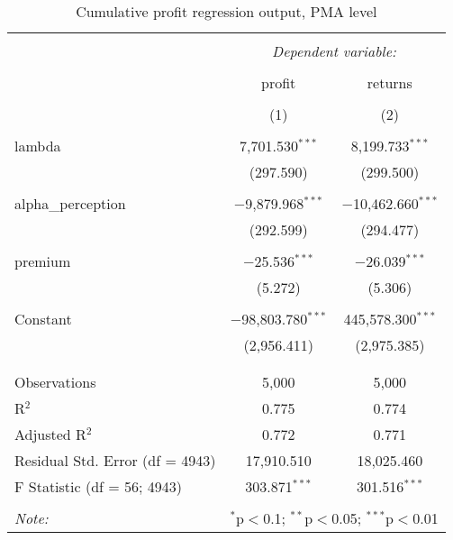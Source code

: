 
\begin{table}[!htbp] \centering 
  \caption{Cumulative profit regression output, PMA level} 
  \label{Tab:InformationConfidence-CumulativeProfit-regtable-pma} 
\begin{tabular}{@{\extracolsep{5pt}}lcc} 
\\[-1.8ex]\hline 
\hline \\[-1.8ex] 
 & \multicolumn{2}{c}{\textit{Dependent variable:}} \\ 
\cline{2-3} 
\\[-1.8ex] & profit & returns \\ 
\\[-1.8ex] & (1) & (2)\\ 
\hline \\[-1.8ex] 
 lambda & 7,701.530$^{***}$ & 8,199.733$^{***}$ \\ 
  & (297.590) & (299.500) \\ 
  & & \\ 
 alpha\_perception & $-$9,879.968$^{***}$ & $-$10,462.660$^{***}$ \\ 
  & (292.599) & (294.477) \\ 
  & & \\ 
 premium & $-$25.536$^{***}$ & $-$26.039$^{***}$ \\ 
  & (5.272) & (5.306) \\ 
  & & \\ 
 Constant & $-$98,803.780$^{***}$ & 445,578.300$^{***}$ \\ 
  & (2,956.411) & (2,975.385) \\ 
  & & \\ 
\hline \\[-1.8ex] 
Observations & 5,000 & 5,000 \\ 
R$^{2}$ & 0.775 & 0.774 \\ 
Adjusted R$^{2}$ & 0.772 & 0.771 \\ 
Residual Std. Error (df = 4943) & 17,910.510 & 18,025.460 \\ 
F Statistic (df = 56; 4943) & 303.871$^{***}$ & 301.516$^{***}$ \\ 
\hline 
\hline \\[-1.8ex] 
\textit{Note:}  & \multicolumn{2}{r}{$^{*}$p$<$0.1; $^{**}$p$<$0.05; $^{***}$p$<$0.01} \\ 
\end{tabular} 
\end{table} 
